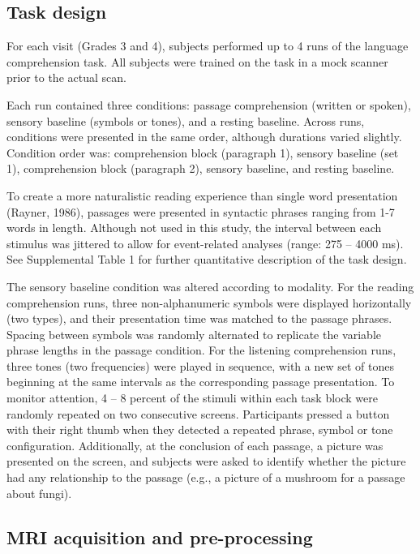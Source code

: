 \subsection{Task design}

For each visit (Grades 3 and 4), subjects performed up to 4 runs of the language comprehension task. All subjects were trained on the task in a mock scanner prior to the actual scan. 

Each run contained three conditions: passage comprehension (written or spoken), sensory baseline (symbols or tones), and a resting baseline.  Across runs, conditions were presented in the same order, although durations varied slightly. Condition order was: comprehension block (paragraph 1), sensory baseline (set 1), comprehension block (paragraph 2), sensory baseline, and resting baseline. 

To create a more naturalistic reading experience than single word presentation (Rayner, 1986), passages were presented in syntactic phrases ranging from 1-7 words in length. Although not used in this study, the interval between each stimulus was jittered to allow for event-related analyses (range: 275 – 4000 ms). See Supplemental Table 1 for further quantitative description of the task design.

The sensory baseline condition was altered according to modality. For the reading comprehension runs, three non-alphanumeric symbols were displayed horizontally (two types), and their presentation time was matched to the passage phrases. Spacing between symbols was randomly alternated to replicate the variable phrase lengths in the passage condition. For the listening comprehension runs, three tones (two frequencies) were played in sequence, with a new set of tones beginning at the same intervals as the corresponding passage presentation. 
To monitor attention, 4 – 8 percent of the stimuli within each task block were randomly repeated on two consecutive screens.  Participants pressed a button with their right thumb when they detected a repeated phrase, symbol or tone configuration. Additionally, at the conclusion of each passage, a picture was presented on the screen, and subjects were asked to identify whether the picture had any relationship to the passage (e.g., a picture of a mushroom for a passage about fungi). 

\subsection{MRI acquisition and pre-processing}

